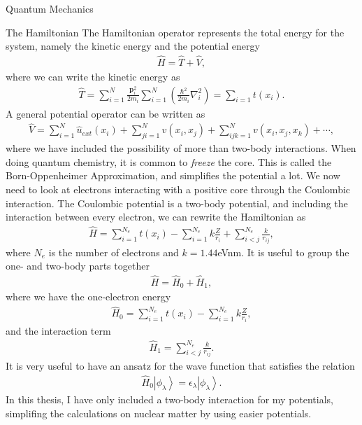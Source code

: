 \documentclass[twoside,english]{uiofysmaster}
\begin{document}
\begin{chapter}{Quantum Mechanics}
 	\begin{section}{The Hamiltonian}
 		The Hamiltonian operator represents the total energy for the system, namely the kinetic energy and the potential energy
 		\begin{align}
 			\hat H = \hat T + \hat V,
 		\end{align}
 		where we can write the kinetic energy as \cite{MHJSlides}
 		\begin{align}
 			\hat T = \sum_{i=1}^N \frac{ \mathbf{p}_i^2}{2m_i} \sum_{i=1}^N \left( \frac{\hbar^2}{2m_i} \nabla_i^2 \right) = \sum_{i=1} t(x_i).
 		\end{align}
 		A general potential operator can be written as
 		\begin{align}
 			\hat V = \sum_{i=1}^N \hat u_{ext}(x_i) + \sum_{ji = 1}^N v(x_i,x_j) + \sum_{ijk=1}^N v(x_i,x_j,x_k) + \cdots ,
 		\end{align}
 		where we have included the possibility of more than two-body interactions. When doing quantum chemistry, it is common to \textit{freeze} the core. This is called the Born-Oppenheimer Approximation, and simplifies the potential a lot. We now need to look at electrons interacting with a positive core through the Coulombic interaction. The Coulombic potential is a two-body potential, and including the interaction between every electron, we can rewrite the Hamiltonian as
 		\begin{align}
 			\hat H = \sum_{i=1}^{N_e} t(x_i) - \sum_{i=1}^{N_e} k \frac{Z}{r_i} + \sum_{i<j}^{N_e} \frac{k}{r_{ij}},
 		\end{align}
 		where $N_e$ is the number of electrons and $k = 1.44$eVnm. It is useful to group the one- and two-body parts together
 		\begin{align}
 			\hat H = \hat H_0 + \hat H_1,
 		\end{align}
 		where we have the one-electron energy
 		\begin{align}
 			\hat H_0 = \sum_{i=1}^{N_e} t(x_i) - \sum_{i=1}^{N_e} k \frac{Z}{r_i},
 		\end{align}
 		and the interaction term
 		\begin{align}
 			\hat H_1 = \sum_{i<j}^{N_e} \frac{k}{r_{ij}}.
 		\end{align}
 		It is very useful to have an ansatz for the wave function that satisfies the relation
 		\begin{align}
 			\hat H_0 \left| \phi_\lambda \right> = \epsilon_\lambda \left| \phi_\lambda \right>.
 		\end{align}
 		In this thesis, I have only included a two-body interaction for my potentials, simplifing the calculations on nuclear matter by using easier potentials. 
 	\end{section}


\end{chapter}
\end{document}
